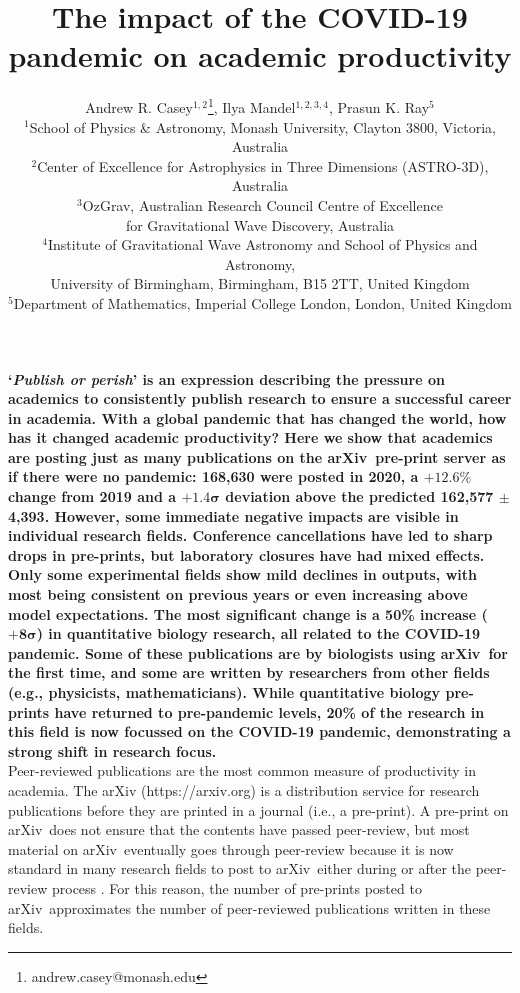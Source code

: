 \documentclass[a4paper,12pt]{article}
\title{The impact of the COVID-19 pandemic on academic productivity}
\author{Andrew R. Casey$^{1,2}$\footnote{andrew.casey@monash.edu},
        Ilya Mandel$^{1,2,3,4}$,
        Prasun K. Ray$^{5}$\\
\normalsize{$^{1}$School of Physics \& Astronomy, Monash University, Clayton 3800, Victoria, Australia}\\
\normalsize{$^{2}$Center of Excellence for Astrophysics in Three Dimensions (ASTRO-3D), Australia}\\
\normalsize{$^{3}$OzGrav, Australian Research Council Centre of Excellence}\\
\normalsize{for Gravitational Wave Discovery, Australia}\\
\normalsize{$^{4}$Institute of Gravitational Wave Astronomy and School of Physics and Astronomy,}\\
\normalsize{University of Birmingham, Birmingham, B15 2TT, United Kingdom}\\
\normalsize{$^{5}$Department of Mathematics, Imperial College London, London, United Kingdom}
}
\date{}
\newcommand{\arxiv}{arXiv}
\begin{document}
\newpage
\setcounter{page}{1}
\resetlinenumber[1]

\maketitle


\noindent \textbf{`\emph{Publish or perish}' is an expression describing the pressure on academics to consistently publish research to ensure a successful career in academia. 
With a global pandemic that has changed the world, how has it changed academic productivity? 
Here we show that academics are posting just as many publications on the \arxiv\ pre-print server as if there were no pandemic: 168,630 were posted in 2020, a $\mathbf{+12.6\%}$ change from 2019 and a $\mathbf{+1.4\sigma}$ deviation above the predicted 162,577 $\mathbf{\pm}$ 4,393.
However, some immediate negative impacts are visible in individual research fields.
Conference cancellations have led to sharp drops in pre-prints, but laboratory closures have had mixed effects.
Only some experimental fields show mild declines in outputs, with most being consistent on previous years or even increasing above model expectations.
The most significant change is a 50\% increase ($\mathbf{+8\sigma}$) in quantitative biology research, all related to the COVID-19 pandemic.
Some of these publications are by biologists using \arxiv\ for the first time, and some are written by researchers from other fields (e.g., physicists, mathematicians).
While quantitative biology pre-prints have returned to pre-pandemic levels, 20\% of the research in this field is now focussed on the COVID-19 pandemic, demonstrating a strong shift in research focus.
}\\

\noindent Peer-reviewed publications are the most common measure of productivity in academia. The \arxiv\cite{Ginsparg:2011} ({https://arxiv.org}) is a distribution service for research publications before they are printed in a journal (i.e., a pre-print). A pre-print on \arxiv\ does not ensure that the contents have passed peer-review, but most material on \arxiv\ eventually goes through peer-review because it is now standard in many research fields to post to \arxiv\ either during or after the peer-review process \cite{Lariviere:2014}. For this reason, the number of pre-prints posted to \arxiv\ approximates the number of peer-reviewed publications written in these fields.
\end{document}
